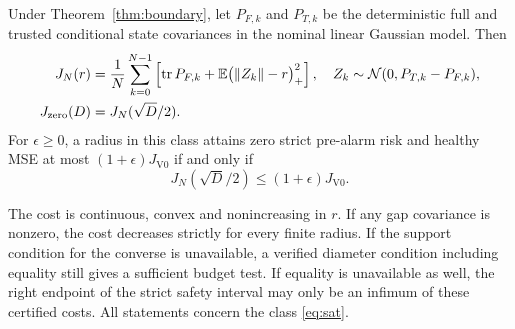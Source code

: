 \begin{corollary}
\label{cor:cost}
Under Theorem~\ref{thm:boundary}, let \(P_{F,k}\) and \(P_{T,k}\) be the deterministic full and trusted conditional state covariances in the nominal linear Gaussian model. Then
\begin{align}
 J_N(r) &= \frac1N \sum_{k=0}^{N-1}
   \left[\operatorname{tr} P_{F,k}
   +\mathbb{E} \big(\|Z_k\|-r\big)_+^2\right],
       \quad Z_k\sim\mathcal N(0,P_{T,k}-P_{F,k}),\label{eq:cost}\\
 J_{\mathrm{zero}}(D)&=J_N(\sqrt D/2).
 \label{eq:zero-cost}
\end{align}
For \(\epsilon\ge0\), a radius in this class attains zero strict pre-alarm risk and healthy MSE at most \((1+\epsilon)J_{\mathrm{V0}}\) if and only if
\begin{equation}
 J_N(\sqrt D/2)\le (1+\epsilon)J_{\mathrm{V0}}.
 \label{eq:budget}
\end{equation}
\end{corollary}

The cost is continuous, convex and nonincreasing in \(r\). If any gap covariance is nonzero, the cost decreases strictly for every finite radius. If the support condition for the converse is unavailable, a verified diameter condition including equality still gives a sufficient budget test. If equality is unavailable as well, the right endpoint of the strict safety interval may only be an infimum of these certified costs. All statements concern the class \eqref{eq:sat}.
